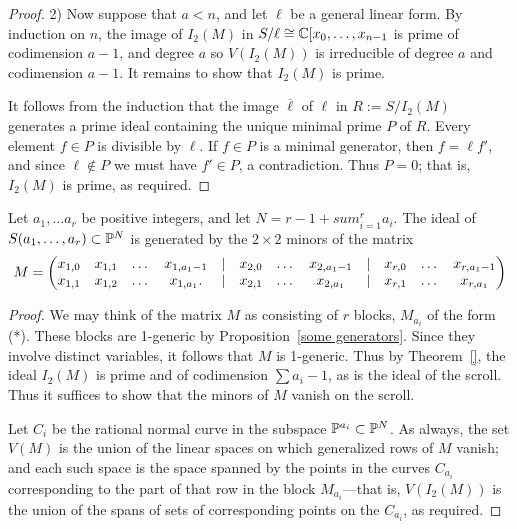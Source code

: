 \begin{proof}
2) Now suppose that $a<n$, and let $\ell$ be a general linear form. By induction on $n$, the image of $I_{2}(M)$ in $S/\ell \cong {\mathbb C}[x_{0},\dots, x_{n-1}$ is prime of codimension $a-1$, and degree $a$ so
$V(I_{2}(M))$ is irreducible of degree $a$ and codimension $a-1$. It remains to show
that $I_{2}(M)$ is prime.

It follows from the induction that the image $\overline \ell$ of $\ell$ in
$R :=  S/I_{2}(M)$  generates a prime ideal containing the
unique minimal prime $P$ of $R$. 
Every element $f\in P$ is divisible by $\ell$. If $f\in P$ is a minimal generator, then $f = \ell f'$, and
since $\ell\notin P$ we must have $f'\in P$, a contradiction. Thus $P = 0$; that is, $I_{2}(M)$ is
prime, as required.
\end{proof}

\begin{corollary}\label{equations of scrolls} Let $a_{1}, \dots a_{r}$ be positive integers, and let $N = r-1+sum_{i=1}^{r} a_{i}$.
The ideal of $S(a_{1},\dots,a_{r})\subset {\mathbb P}^{N}$ is generated by the $2\times 2$ minors of the matrix
$$
\setcounter{MaxMatrixCols}{20}
M = \begin{pmatrix}
x_{1,0}&x_{1,1}&\dots&x_{1, a_{1}-1}&|&x_{2,0}&\dots&x_{2, a_{1}-1}&|&x_{r,0}&\dots&x_{r, a_{1}-1}\\
x_{1,1}&x_{1,2}&\dots&x_{1, a_{1}}.  &|&x_{2,1}&\dots&x_{2, a_{1}}&|&x_{r,1}&\dots&x_{r, a_{1}}
\end{pmatrix}
$$
\end{corollary}

\begin{proof} We may think of the matrix $M$ as consisting of $r$ blocks, $M_{a_{i}}$ of the form (*). These blocks are 1-generic by Proposition~\ref{some generators}. Since they involve distinct variables, it follows that $M$ is 1-generic. Thus by
Theorem~\ref{}, the ideal $I_{2}(M)$ is prime and of codimension $\sum a_{i}-1$, as is the ideal of the scroll. Thus it suffices to show that the minors of $M$ vanish on the scroll.

Let $C_{i}$ be the rational normal curve in the subspace ${\mathbb P}^{a_{i}}\subset{\mathbb P}^{N}$.
As always, the set $V(M)$ is the union of the linear spaces on which generalized rows of $M$ vanish; and each such space is the space spanned by the points in the curves $C_{a_{i}}$ corresponding to the part of that row in the block $M_{a_{i}}$---that is, $V(I_{2}(M))$ is the union of the spans of sets of corresponding points on the $C_{a_{i}}$, as required.
\end{proof}

